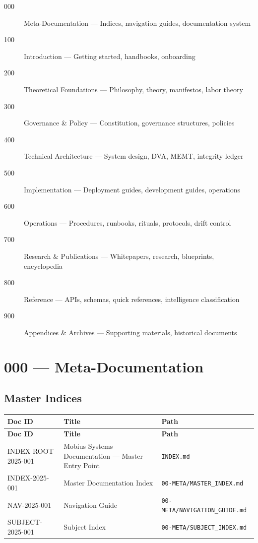 \documentclass[11pt,a4paper]{article}
\begin{document}
\begin{description}
    \item[000] Meta-Documentation — Indices, navigation guides, documentation system
    \item[100] Introduction — Getting started, handbooks, onboarding
    \item[200] Theoretical Foundations — Philosophy, theory, manifestos, labor theory
    \item[300] Governance \& Policy — Constitution, governance structures, policies
    \item[400] Technical Architecture — System design, DVA, MEMT, integrity ledger
    \item[500] Implementation — Deployment guides, development guides, operations
    \item[600] Operations — Procedures, runbooks, rituals, protocols, drift control
    \item[700] Research \& Publications — Whitepapers, research, blueprints, encyclopedia
    \item[800] Reference — APIs, schemas, quick references, intelligence classification
    \item[900] Appendices \& Archives — Supporting materials, historical documents
\end{description}

\section{000 — Meta-Documentation}

\subsection{Master Indices}

\begin{longtable}{p{2cm}p{8cm}p{3cm}}
\toprule
\textbf{Doc ID} & \textbf{Title} & \textbf{Path} \\
\midrule
\endfirsthead
\toprule
\textbf{Doc ID} & \textbf{Title} & \textbf{Path} \\
\midrule
\endhead
INDEX-ROOT-2025-001 & Mobius Systems Documentation — Master Entry Point & \texttt{INDEX.md} \\
INDEX-2025-001 & Master Documentation Index & \texttt{00-META/MASTER\_INDEX.md} \\
NAV-2025-001 & Navigation Guide & \texttt{00-META/NAVIGATION\_GUIDE.md} \\
SUBJECT-2025-001 & Subject Index & \texttt{00-META/SUBJECT\_INDEX.md} \\
\bottomrule
\end{longtable}
\end{document}
